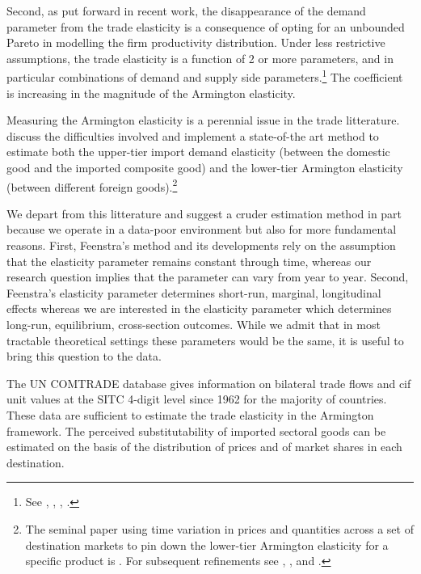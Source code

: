 \documentclass[12pt,twoside,a4paper,notitlepage]{article}
\begin{document}
Second, as put forward in recent work, the disappearance of the demand parameter from the trade elasticity is a consequence of opting for an unbounded Pareto in modelling the firm productivity distribution. Under less restrictive assumptions, the trade elasticity is a function of 2 or more parameters, and in particular combinations of demand and supply side parameters.\footnote{See \cite{Costinot2014}, \cite{Bas2017}, \cite{Feenstra2018}, \cite{Feenstra2018a}.} The coefficient is increasing in the magnitude of the Armington elasticity.

Measuring the Armington elasticity is a perennial issue in the trade litterature. 
\cite{Feenstra2018} discuss the difficulties involved and implement a state-of-the art method to estimate both the upper-tier import demand elasticity (between the domestic good and the imported composite good) and the lower-tier Armington elasticity (between different foreign goods).\footnote{The seminal paper using time variation in prices and quantities across a set of destination markets to pin down the lower-tier Armington elasticity for a specific product is \cite{Feenstra1994}. For subsequent refinements see \cite{Broda2006b}, \cite{Imbs2015}, and \cite{Soderbery2018}.}

We depart from this litterature and suggest a cruder estimation method in part because we operate in a data-poor environment but also for more fundamental reasons.
First, Feenstra's method and its developments rely on the assumption that the elasticity parameter remains constant through time, whereas our research question implies that the parameter can vary from year to year.
Second, Feenstra's elasticity parameter determines short-run, marginal, longitudinal effects whereas we are interested in the elasticity parameter which determines long-run, equilibrium, cross-section outcomes.
While we admit that in most tractable theoretical settings these parameters would be the same, it is useful to bring this question to the data.

The UN COMTRADE database gives information on bilateral trade flows and cif unit values at the SITC 4-digit level since 1962 for the majority of countries.
These data are sufficient to estimate the trade elasticity in the Armington framework.
The perceived substitutability of imported sectoral goods can be estimated on the basis of the distribution of prices and of market shares in each destination.
\end{document}
